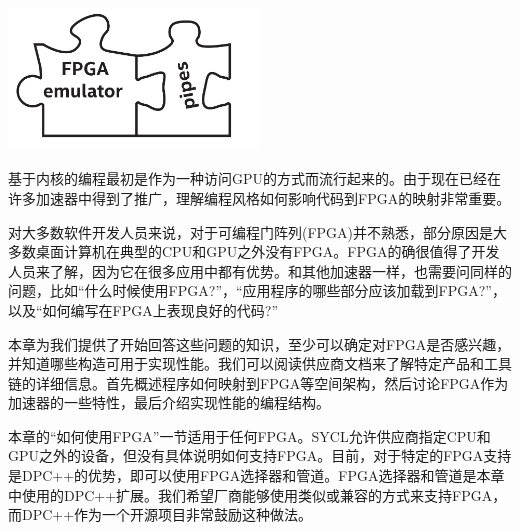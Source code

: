 \begin{center}
	\includegraphics[width=0.5\textwidth]{content/chapter-17/images/1}
\end{center}

基于内核的编程最初是作为一种访问GPU的方式而流行起来的。由于现在已经在许多加速器中得到了推广，理解编程风格如何影响代码到FPGA的映射非常重要。\par

对大多数软件开发人员来说，对于可编程门阵列(FPGA)并不熟悉，部分原因是大多数桌面计算机在典型的CPU和GPU之外没有FPGA。FPGA的确很值得了开发人员来了解，因为它在很多应用中都有优势。和其他加速器一样，也需要问同样的问题，比如“什么时候使用FPGA?”，“应用程序的哪些部分应该加载到FPGA?”，以及“如何编写在FPGA上表现良好的代码?”\par

本章为我们提供了开始回答这些问题的知识，至少可以确定对FPGA是否感兴趣，并知道哪些构造可用于实现性能。我们可以阅读供应商文档来了解特定产品和工具链的详细信息。首先概述程序如何映射到FPGA等空间架构，然后讨论FPGA作为加速器的一些特性，最后介绍实现性能的编程结构。\par

本章的“如何使用FPGA”一节适用于任何FPGA。SYCL允许供应商指定CPU和GPU之外的设备，但没有具体说明如何支持FPGA。目前，对于特定的FPGA支持是DPC++的优势，即可以使用FPGA选择器和管道。FPGA选择器和管道是本章中使用的DPC++扩展。我们希望厂商能够使用类似或兼容的方式来支持FPGA，而DPC++作为一个开源项目非常鼓励这种做法。\par






















































